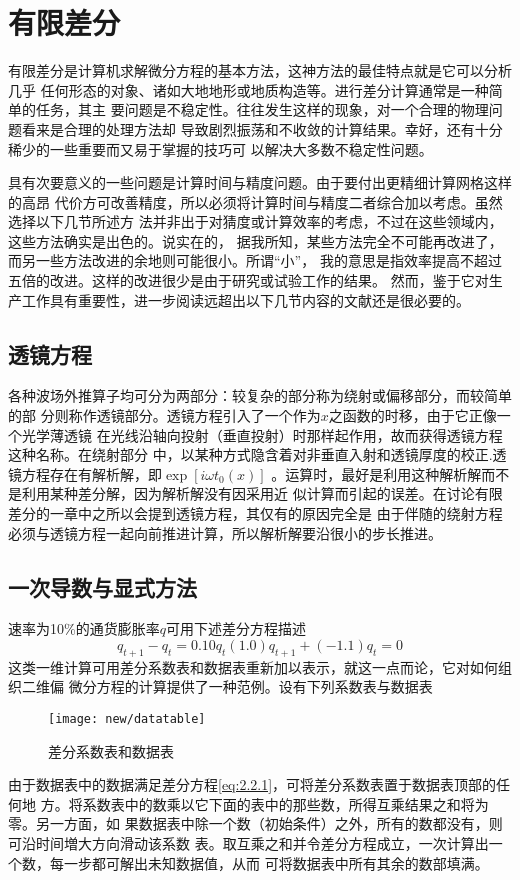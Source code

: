 \section{有限差分}
有限差分是计算机求解微分方程的基本方法，这神方法的最佳特点就是它可以分析几乎
任何形态的对象、诸如大地地形或地质构造等。进行差分计算通常是一种简单的任务，其主
要问题是不稳定性。往往发生这样的现象，对一个合理的物理问题看来是合理的处理方法却
导致剧烈振荡和不收敛的计算结果。幸好，还有十分稀少的一些重要而又易于掌握的技巧可
以解决大多数不稳定性问题。

具有次要意义的一些问题是计算时间与精度问题。由于要付出更精细计算网格这样的高昂
代价方可改善精度，所以必须将计算时间与精度二者综合加以考虑。虽然选择以下几节所述方
法并非出于对猜度或计算效率的考虑，不过在这些领域内，这些方法确实是出色的。说实在的，
据我所知，某些方法完全不可能再改进了，而另一些方法改进的余地则可能很小。所谓“小”，
我的意思是指效率提高不超过五倍的改进。这样的改进很少是由于研究或试验工作的结果。
然而，鉴于它对生产工作具有重要性，进一步阅读远超出以下几节内容的文献还是很必要的。

\subsection{透镜方程}
各种波场外推算子均可分为两部分：较复杂的部分称为绕射或偏移部分，而较简单的部
分则称作透镜部分。透镜方程引入了一个作为$x$之函数的时移，由于它正像一个光学薄透镜
在光线沿轴向投射（垂直投射）时那样起作用，故而获得透镜方程这种名称。在绕射部分
中，以某种方式隐含着对非垂直入射和透镜厚度的校正.透镜方程存在有解析解，即$\exp[i\omega t_0(x)]$
。运算时，最好是利用这种解析解而不是利用某种差分解，因为解析解没有因采用近
似计算而引起的误差。在讨论有限差分的一章中之所以会提到透镜方程，其仅有的原因完全是
由于伴随的绕射方程必须与透镜方程一起向前推进计算，所以解析解要沿很小的步长推进。

\subsection{一次导数与显式方法}

速率为10\%的通货膨胀率$q$可用下述差分方程描述
\begin{subequations}
\begin{equation}
q_{t+1}-q_t=0.10q_t
\label{eq:2.2.1a}
\end{equation}
\begin{equation}
(1.0)q_{t+1}+(-1.1)q_t=0
\label{eq:2.2.1b}
\end{equation}
\label{eq:2.2.1}
\end{subequations}
这类一维计算可用差分系数表和数据表重新加以表示，就这一点而论，它对如何组织二维偏
微分方程的计算提供了一种范例。设有下列系数表与数据表
\begin{figure}[H]
\centering
\texttt{[image: new/datatable]}
\caption[datatable]{差分系数表和数据表}
\label{fig:new/datatable}
\end{figure}
由于数据表中的数据满足差分方程\ref{eq:2.2.1}，可将差分系数表置于数据表顶部的任何地
方。将系数表中的数乘以它下面的表中的那些数，所得互乘结果之和将为零。另一方面，如
果数据表中除一个数（初始条件）之外，所有的数都没有，则可沿时间増大方向滑动该系数
表。取互乘之和并令差分方程成立，一次计算出一个数，每一步都可解出未知数据值，从而
可将数据表中所有其余的数部填满。

